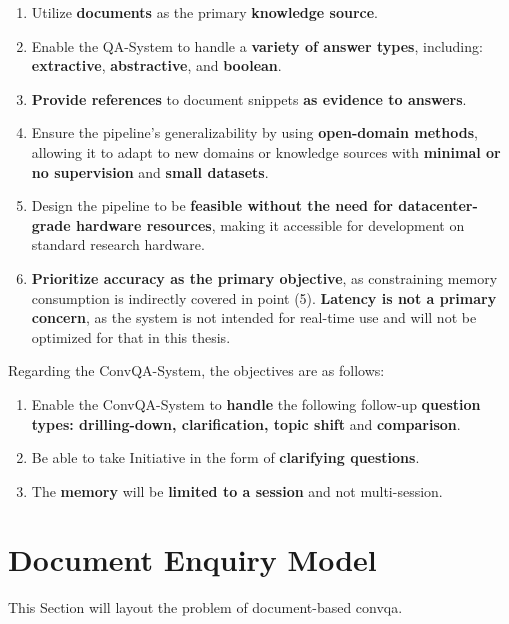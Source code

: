 \begin{enumerate}
    \item Utilize \textbf{documents} as the primary \textbf{knowledge source}.
    \item Enable the QA-System to handle a \textbf{variety of answer types}, including: \textbf{extractive}, \textbf{abstractive}, and \textbf{boolean}.
    \item \textbf{Provide references} to document snippets \textbf{as evidence to answers}.
    \item Ensure the pipeline's generalizability by using \textbf{open-domain methods}, allowing it to adapt to new domains or knowledge sources with \textbf{minimal or no supervision} and \textbf{small datasets}.
    \item Design the pipeline to be \textbf{feasible without the need for datacenter-grade hardware resources}, making it accessible for development on standard research hardware.
    \item \textbf{Prioritize accuracy as the primary objective}, as constraining memory consumption is indirectly covered in point (5). \textbf{Latency is not a primary concern}, as the system is not intended for real-time use and will not be optimized for that in this thesis.
\end{enumerate}


Regarding the ConvQA-System, the objectives are as follows:

\begin{enumerate}
    \item Enable the ConvQA-System to \textbf{handle} the following follow-up \textbf{question types: drilling-down, clarification, topic shift} and \textbf{comparison}.
    \item Be able to take Initiative in the form of \textbf{clarifying questions}.
    \item The \textbf{memory} will be \textbf{limited to a session} and not multi-session.
\end{enumerate}

\section{Document Enquiry Model}
\label{sec:problem_statement}

This Section will layout the problem of document-based \gls{convqa}. 

